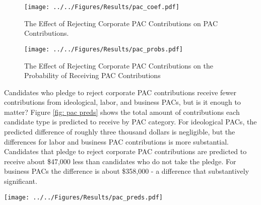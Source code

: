 \documentclass[12pt]{article}
\begin{document}
\begin{figure*}[!htb]
    \centering
    \begin{subfigure}[b]{0.65\textwidth}
        \centering
        \texttt{[image: ../../Figures/Results/pac\_coef.pdf]}
        \caption{The Effect of Rejecting Corporate PAC Contributions on PAC Contributions.}
        \label{fig: pac coefs}
    \end{subfigure}
    
    \begin{subfigure}[b]{0.65\textwidth}
        \centering
        \texttt{[image: ../../Figures/Results/pac\_probs.pdf]}
        \caption{The Effect of Rejecting Corporate PAC Contributions on the Probability of Receiving PAC Contributions}
        \label{fig: pac probs}
    \end{subfigure}
    \caption{\textbf{The Effect of Rejecting Corporate PAC Contributions on PAC Contributions and the Probability of Receiving Money from PACs.} These figures present the posterior distributions estimated for a candidate that pledges to reject corporate PAC contributions. The dot shows the median coefficient estimate and the intervals show the 50\% and 89\% highest density intervals. Figure \ref{fig: pac coefs} shows that candidates that pledge to reject corporate PAC contributions experience a reduction in contributions from all types of PACs. Figure \ref{fig: pac probs} shows that rejecting corporate PAC contributions increases the probability of not receiving contributions from business PACs. See Table \ref{tbl: pac results} for the formal estimates.}
    \label{fig: pac results}
\end{figure*}

Candidates who pledge to reject corporate PAC contributions receive fewer contributions from ideological, labor, and business PACs, but is it enough to matter? Figure \ref{fig: pac preds} shows the total amount of contributions each candidate type is predicted to receive by PAC category. For ideological PACs, the predicted difference of roughly three thousand dollars is negligible, but the differences for labor and business PAC contributions is more substantial. Candidates that pledge to reject corporate PAC contributions are predicted to receive about \$47,000 less than candidates who do not take the pledge. For business PACs the difference is about \$358,000 - a difference that substantively significant.  

\begin{figure*}[!htb]
	\centering
	\texttt{[image: ../../Figures/Results/pac\_preds.pdf]}
	\caption{\textbf{Total Predicted Contributions from Each PAC by Candidate Type.} This figure shows that candidates who pledge to reject PAC contributions are predicted to received fewer contributions from PACs, but the difference is largest for contributions from business PACs.}
	\label{fig: pac preds}
\end{figure*}
\end{document}
